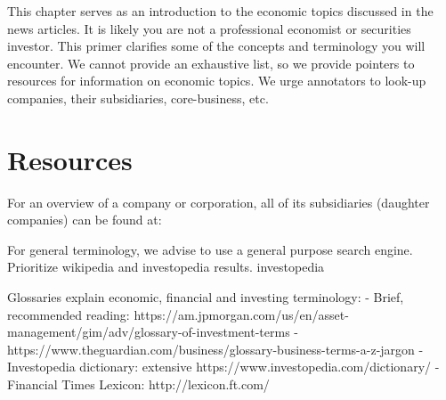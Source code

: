 This chapter serves as an introduction to the economic topics discussed in the news articles.
It is likely you are not a professional economist or securities investor.
This primer clarifies some of the concepts and terminology you will encounter.
We cannot provide an exhaustive list, so we provide pointers to resources for information on economic topics.
We urge annotators to look-up companies, their subsidiaries, core-business, etc. 

\section{Resources}
For an overview of a company or corporation, all of its subsidiaries (daughter companies) can be found at:

For general terminology, we advise to use a general purpose search engine.
Prioritize wikipedia and investopedia results.
investopedia

Glossaries explain economic, financial and investing terminology:
- Brief, recommended reading: https://am.jpmorgan.com/us/en/asset-management/gim/adv/glossary-of-investment-terms
- https://www.theguardian.com/business/glossary-business-terms-a-z-jargon
- Investopedia dictionary: extensive https://www.investopedia.com/dictionary/
- Financial Times Lexicon: http://lexicon.ft.com/